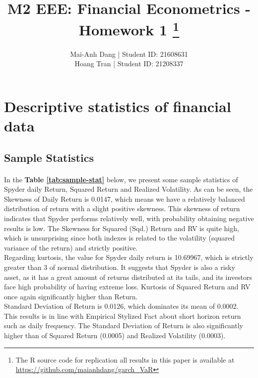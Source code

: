 \documentclass[a4paper]{article}
\title{M2 EEE: Financial Econometrics - Homework 1 \footnote{The R source code for replication all results in this paper is available at \url{https://github.com/maianhdang/garch_VaR} }}
\author{Mai-Anh Dang | Student ID: 21608631 \\
Hoang Tran | Student ID: 21208337 }
\begin{document}
\maketitle


\section{Descriptive statistics of financial data}
\subsection{Sample Statistics}

\paragraph{}
In the \textbf{Table \ref{tab:sample-stat}} below, we present some sample statistics of Spyder daily Return, Squared Return and Realized Volatility. As can be seen, the Skewness of Daily Return is 0.0147, which means we have a relatively balanced distribution of return with a slight positive skewness. This skewness of return indicates that Spyder performs relatively well, with probability obtaining negative results is low. The Skewness for Squared (Sqd.) Return and RV is quite high, which is unsurprising since both indexes is related to the volatility (squared variance of the return) and strictly positive.\\

Regarding kurtosis, the value for Spyder daily return is 10.69967, which is strictly greater than 3 of normal distribution. It suggests that Spyder is also a risky asset, as it has a great amount of returns distributed at its tails, and its investors face high probability of having extreme loss. Kurtosis of Squared Return and RV once again significantly higher than Return.\\

Standard Deviation of Return is 0.0126, which dominates its mean of 0.0002. This results is in line with Empirical Stylized Fact about short horizon return such as daily frequency. The Standard Deviation of Return is also significantly higher than of Squared Return (0.0005) and Realized Volatility (0.0003).

\end{document}
